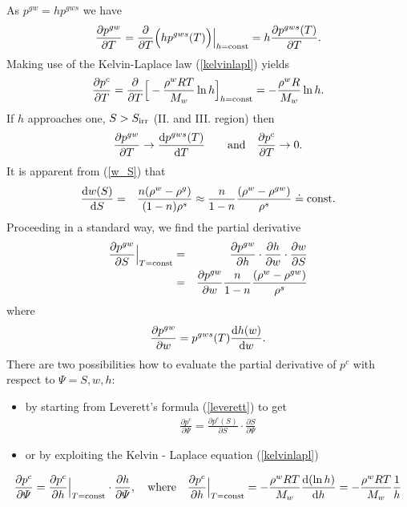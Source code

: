 As $p^{gw} = h p^{gws}$ we have
\begin{eqnarray}
\frac{\partial p^{gw}}{\partial T} = \frac{\partial}{\partial T} \Big(h p^{gws}(T)\Big)\Big|_{h = {\rm const}} 
= h \frac{\partial p^{gws}(T)}{\partial T}.
\end{eqnarray}
Making use of the Kelvin-Laplace law (\ref{kelvinlapl}) yields
\begin{eqnarray}
\frac{\partial p^{c}}{\partial T} = \frac{\partial}{\partial T} \Big[-\frac{\rho^w R T}{M_w}\ln h \Big]_{h = {\rm const}} 
= -\frac{\rho^w R}{M_w}\ln h.
\end{eqnarray}
If $h$ approaches one, $S > S_{\rm irr}$ (II. and III. region) then 
\begin{eqnarray}\label{region}
\frac{\partial p^{gw}}{\partial T} \rightarrow \frac{{\rm d} p^{gws}(T)}{{\rm d} T} 
\qquad {\rm and} \quad \frac{\partial p^{c}}{\partial T}\rightarrow 0.
\end{eqnarray}
It is apparent from (\ref{w_S}) that
\begin{eqnarray}
\frac{{\rm d} w(S)}{{\rm d} S}  &=& \frac{n(\rho^w - \rho^g)}{(1-n)\rho^s} 
\approx \frac{n}{1-n}\frac{(\rho^w - \rho^{gw})}{\rho^s} \doteq {\rm const}.
\end{eqnarray}
Proceeding in a standard way, we find the partial derivative
\begin{eqnarray}
\frac{\partial p^{gw}}{\partial S}\Big|_{T = {\rm const}} &=& 
\frac{\partial p^{gw}}{\partial h} \cdot \frac{\partial h}{\partial w}
\cdot \frac{\partial w}{\partial S}\nonumber\\
&=& \frac{\partial p^{gw}}{\partial w} \frac{n}{1-n}\frac{(\rho^w - \rho^{gw})}{\rho^s}
\end{eqnarray}
where
\begin{eqnarray}
\frac{\partial p^{gw}}{\partial w} = p^{gws}(T) \frac{{\rm d} h(w)}{{\rm d} w}.
\end{eqnarray}
There are two possibilities how to evaluate the partial derivative of $p^c$ with respect to $\varPsi = S, w, h$:
\begin{itemize}
\item{by starting from Leverett's formula (\ref{leverett}) to get}
\begin{eqnarray}
\frac{\partial p^{c}}{\partial \varPsi} = \frac{\partial p^{c}(S)}{\partial S} \cdot \frac{\partial S}{\partial \varPsi}
\end{eqnarray}
\item{or by exploiting the Kelvin - Laplace equation (\ref{kelvinlapl})}
\end{itemize}
\begin{eqnarray}
\frac{\partial p^{c}}{\partial \varPsi} = \frac{\partial p^{c}}{\partial h}\Big|_{T = {\rm const}} 
\cdot \frac{\partial h}{\partial \varPsi},
\quad {\rm where} \quad \frac{\partial p^{c}}{\partial h}\Big|_{T = {\rm const}} = -\frac{\rho^w R T}{M_w} 
\frac{{\rm d}(\ln h)}{{\rm d} h} = 
- \frac{\rho^w R T}{M_w} \frac{1}{h}
\end{eqnarray}


